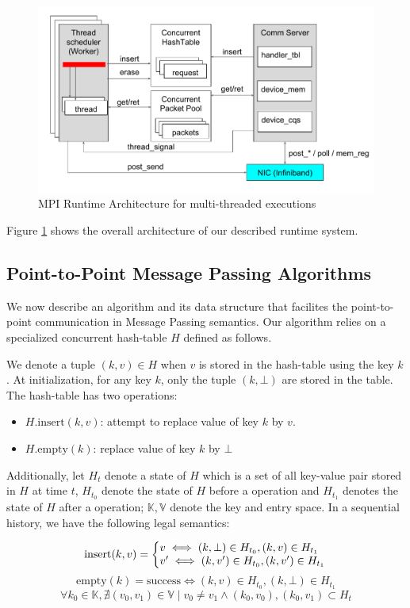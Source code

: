 \documentclass{sig-alternate-05-2015}
\begin{document}
\begin{figure}
  \centering
  \includegraphics[width=.6\textwidth]{fig/runtime.pdf}
  \caption{MPI Runtime Architecture for multi-threaded executions}\label{fig:overall}
\end{figure}

Figure \ref{fig:overall} shows the overall architecture of our described
runtime system.

\subsection{Point-to-Point Message Passing Algorithms}
We now describe an algorithm and its data structure that facilites the
point-to-point communication in Message Passing semantics. Our algorithm relies
on a specialized concurrent hash-table $H$ defined as follows.

We denote a tuple $(k,v) \in H$ when $v$ is stored in the hash-table using the
key $k$. At initialization, for any key $k$, only the tuple $(k,\bot)$ are
stored in the table. The hash-table has two operations: 

\begin{itemize}
  \item $H.\text{insert}(k,v)$: attempt to replace value of key $k$ by $v$.
  \item $H.\text{empty}(k)$: replace value of key $k$ by $\bot$
\end{itemize}

Additionally, let $H_t$ denote a state of $H$ which is a set of all key-value
pair stored in $H$ at time $t$, $H_{t_0}$ denote the state of $H$ before a
operation and $H_{t_1}$ denotes the state of $H$ after a operation;
$\mathbb{K}, \mathbb{V}$ denote the key and entry space. In a sequential
history, we have the following legal semantics:

\begin{equation}
  \text{insert}(k, v) = \left\{
    \begin{array}{@{}l@{\thinspace}l}
      v \iff (k,\bot) \in H_{t_0}, (k,v) \in H_{t_1}\\
      v' \iff (k,v') \in H_{t_0}, (k,v') \in H_{t_1}
    \end{array}
    \right.
\end{equation}
\begin{equation}
  \text{empty}(k) = \text{success} \iff  (k,v) \in H_{t_0}, (k,\bot) \in H_{t_1}
\end{equation}
\begin{equation}
  \forall k_0 \in \mathbb{K}, \nexists {(v_0, v_1) \in \mathbb{V}}
  \mid {{v_0 \ne v_1} \wedge {(k_0, v_0), (k_0, v_1)} \subset H_{t}}
\end{equation}
\end{document}
